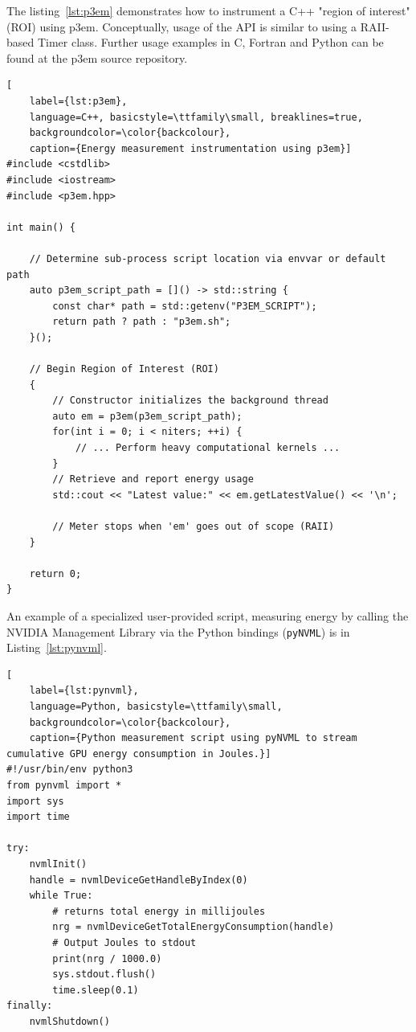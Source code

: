 \documentclass[a4paper,12pt]{article}
\begin{document}
The listing~\ref{lst:p3em} demonstrates how to instrument a C++ "region of interest" (ROI)
using p3em. Conceptually, usage of the API is similar to using a RAII-based Timer class.
Further usage examples in C, Fortran and Python can be found at the p3em source repository.

\begin{lstlisting}[
    label={lst:p3em},
    language=C++, basicstyle=\ttfamily\small, breaklines=true,
    backgroundcolor=\color{backcolour},
    caption={Energy measurement instrumentation using p3em}]
#include <cstdlib>
#include <iostream>
#include <p3em.hpp>

int main() {

    // Determine sub-process script location via envvar or default path
    auto p3em_script_path = []() -> std::string {
        const char* path = std::getenv("P3EM_SCRIPT");
        return path ? path : "p3em.sh";
    }();

    // Begin Region of Interest (ROI)
    {
        // Constructor initializes the background thread
        auto em = p3em(p3em_script_path);
        for(int i = 0; i < niters; ++i) {
            // ... Perform heavy computational kernels ...
        }
        // Retrieve and report energy usage
        std::cout << "Latest value:" << em.getLatestValue() << '\n';

        // Meter stops when 'em' goes out of scope (RAII)
    }

    return 0;
}
\end{lstlisting}

An example of a specialized user-provided script, measuring energy by calling the NVIDIA Management Library
via the Python bindings (\texttt{pyNVML}) is in Listing~\ref{lst:pynvml}.

\begin{lstlisting}[
    label={lst:pynvml},
    language=Python, basicstyle=\ttfamily\small,
    backgroundcolor=\color{backcolour},
    caption={Python measurement script using pyNVML to stream cumulative GPU energy consumption in Joules.}]
#!/usr/bin/env python3
from pynvml import *
import sys
import time

try:
    nvmlInit()
    handle = nvmlDeviceGetHandleByIndex(0)
    while True:
        # returns total energy in millijoules
        nrg = nvmlDeviceGetTotalEnergyConsumption(handle)
        # Output Joules to stdout
        print(nrg / 1000.0)
        sys.stdout.flush()
        time.sleep(0.1)
finally:
    nvmlShutdown()
\end{lstlisting}
\end{document}
